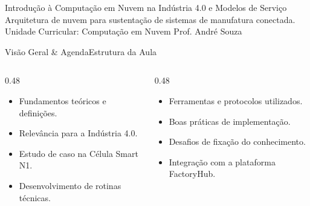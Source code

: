 
\senaicover
  {Introdução à Computação em Nuvem na Indústria 4.0 e Modelos de Serviço}
  {Arquitetura de nuvem para sustentação de sistemas de manufatura conectada.}
  {Unidade Curricular: Computação em Nuvem}
  {Prof. André Souza}

\begin{senaiframe}{Visão Geral \& Agenda}{Estrutura da Aula}
  \begin{columns}[t]
    \begin{column}{0.48\textwidth}
      \begin{tcolorbox}[senaibluecard, title={1. Conceitos Chave}]
        \begin{itemize}
          \item Fundamentos teóricos e definições.
          \item Relevância para a Indústria 4.0.
        \end{itemize}
      \end{tcolorbox}
      \vspace{4pt}
      \begin{tcolorbox}[senaiambercard, title={3. Aplicação Prática}]
        \begin{itemize}
          \item Estudo de caso na Célula Smart N1.
          \item Desenvolvimento de rotinas técnicas.
        \end{itemize}
      \end{tcolorbox}
    \end{column}
    \begin{column}{0.48\textwidth}
      \begin{tcolorbox}[senairedcard, title={2. Detalhamento Técnico}]
        \begin{itemize}
          \item Ferramentas e protocolos utilizados.
          \item Boas práticas de implementação.
        \end{itemize}
      \end{tcolorbox}
      \vspace{4pt}
      \begin{tcolorbox}[senaigreencard, title={4. Exercícios \& Avaliação}]
        \begin{itemize}
          \item Desafios de fixação do conhecimento.
          \item Integração com a plataforma FactoryHub.
        \end{itemize}
      \end{tcolorbox}
    \end{column}
  \end{columns}
\end{senaiframe}

